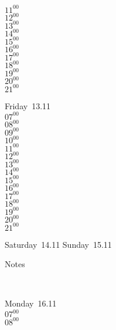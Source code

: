 \documentclass[11pt,a4paper]{book}\usepackage[]{graphicx}\usepackage[]{color}
\begin{document}
{{{{{{{{{{{{{{{{{{{\begin{tcolorbox}
{$11^{00}$\\
$12^{00}$\\
$13^{00}$\\
$14^{00}$\\
$15^{00}$\\
$16^{00}$\\
$17^{00}$\\
$18^{00}$\\
$19^{00}$\\
$20^{00}$\\
$21^{00}$}\\
\end{tcolorbox} 
%
\begin{tcolorbox}
Friday~13.11\\
{ 
$07^{00}$\\
$08^{00}$\\
$09^{00}$\\
$10^{00}$\\
$11^{00}$\\
$12^{00}$\\
$13^{00}$\\
$14^{00}$\\
$15^{00}$\\
$16^{00}$\\
$17^{00}$\\
$18^{00}$\\
$19^{00}$\\
$20^{00}$\\
$21^{00}$}\\
\end{tcolorbox} 
%
\begin{tcolorbox}[height=(\textheight-10mm)/6]
Saturday~14.11
\tcblower
Sunday~15.11
\end{tcolorbox} %
%
\begin{tcolorbox}[height=(\textheight-10mm)/6,sidebyside=false]
Notes
\end{tcolorbox}
\clearpage
\vspace{2 mm}\\
%
%
\begin{tcolorbox}
Monday~16.11\\
{ 
$07^{00}$\\
$08^{00}$\\
}
\end{tcolorbox}}}}}}}}}}}}}}}}}}}}
\end{document}
